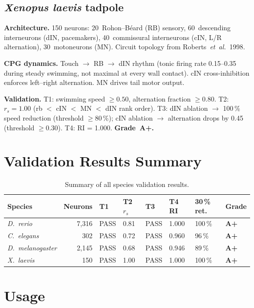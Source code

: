 \documentclass[11pt,a4paper]{article}
\begin{document}
\subsection{\textit{Xenopus laevis} tadpole}

\textbf{Architecture.}
150 neurons: 20~Rohon--B\'{e}ard (RB) sensory, 60~descending
interneurons (dIN, pacemakers), 40~commissural interneurons (cIN,
L/R alternation), 30~motoneurons (MN).
Circuit topology from Roberts~\textit{et~al.}\ 1998.

\textbf{CPG dynamics.}
Touch $\to$ RB $\to$ dIN rhythm (tonic firing rate 0.15--0.35
during steady swimming, not maximal at every wall contact).
cIN cross-inhibition enforces left--right alternation.
MN drives tail motor output.

\textbf{Validation.}
T1: swimming speed $\geq 0.50$, alternation fraction $\geq 0.80$.
T2: $r_s = 1.00$ (rb $<$ cIN $<$ MN $<$ dIN rank order).
T3: dIN ablation $\to$ 100\,\% speed reduction (threshold $\geq 80$\,\%);
cIN ablation $\to$ alternation drops by 0.45 (threshold $\geq 0.30$).
T4: RI = 1.000.
\textbf{Grade~A+.}

\section{Validation Results Summary}

\begin{table}[h]
\centering
\caption{Summary of all species validation results.}
\begin{tabular}{lrllllll}
\toprule
Species & Neurons & T1 & T2 $r_s$ & T3 & T4 RI & 30\,\% ret. & Grade \\
\midrule
\textit{D.\ rerio}        & 7,316 & PASS & 0.81 & PASS & 1.000 & 100\,\% & \textbf{A+} \\
\textit{C.\ elegans}      &   302 & PASS & 0.72 & PASS & 0.960 &  96\,\% & \textbf{A+} \\
\textit{D.\ melanogaster} & 2,145 & PASS & 0.68 & PASS & 0.946 &  89\,\% & \textbf{A+} \\
\textit{X.\ laevis}       &   150 & PASS & 1.00 & PASS & 1.000 & 100\,\% & \textbf{A+} \\
\bottomrule
\end{tabular}
\end{table}

\section{Usage}
\end{document}
